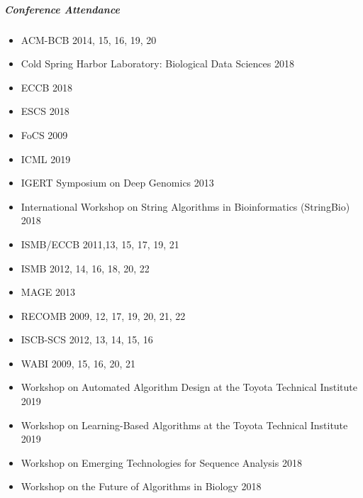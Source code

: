 \documentclass[10pt,letterpaper]{article}
\begin{document}
\subparagraph{Conference Attendance}
\begin{itemize}
	\item ACM-BCB 2014, 15, 16, 19, 20
	\item Cold Spring Harbor Laboratory: Biological Data Sciences 2018
	\item ECCB 2018
	\item ESCS 2018
	\item FoCS 2009
	\item ICML 2019
	\item IGERT Symposium on Deep Genomics 2013
	\item International Workshop on String Algorithms in Bioinformatics (StringBio) 2018
	\item ISMB/ECCB 2011,13, 15, 17, 19, 21
	\item ISMB 2012, 14, 16, 18, 20, 22
	\item MAGE 2013
	\item RECOMB 2009, 12, 17, 19, 20, 21, 22
	\item ISCB-SCS 2012, 13, 14, 15, 16
	\item WABI 2009, 15, 16, 20, 21
	\item Workshop on Automated Algorithm Design at the Toyota Technical Institute 2019
	\item Workshop on Learning-Based Algorithms at the Toyota Technical Institute 2019
	\item Workshop on Emerging Technologies for Sequence Analysis 2018
	\item Workshop on the Future of Algorithms in Biology 2018
\end{itemize}
\end{document}
